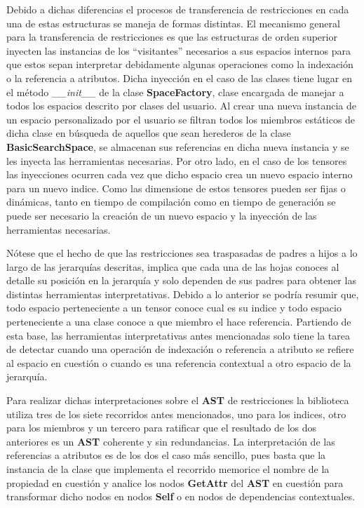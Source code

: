 Debido a dichas diferencias el procesos de transferencia de restricciones en cada una de estas estructuras se maneja de formas
distintas. El mecanismo general para la transferencia de restricciones es que las estructuras de orden superior inyecten las
instancias de los ``visitantes'' necesarios a sus espacios internos para que estos sepan interpretar debidamente algunas operaciones
como la indexación o la referencia a atributos. Dicha inyección en el caso de las clases tiene lugar en el método \newline
{\it \_\_init\_\_} de la clase {\bf SpaceFactory}, clase encargada de manejar a todos los espacios descrito por clases del usuario. Al crear una nueva instancia
de un espacio personalizado por el usuario se filtran todos los miembros estáticos de dicha clase en búsqueda de aquellos que sean
herederos de la clase {\bf BasicSearchSpace}, se almacenan sus referencias en dicha nueva instancia y se les inyecta las herramientas
necesarias. Por otro lado, en el caso de los tensores las inyecciones ocurren cada vez que dicho espacio crea un nuevo espacio
interno para un nuevo indice. Como las dimensione de estos tensores pueden ser fijas o dinámicas, tanto en tiempo de compilación
como en tiempo de generación se puede ser necesario la creación de un nuevo espacio y la inyección de las herramientas necesarias.

Nótese que el hecho de que las restricciones sea traspasadas de padres a hijos a lo largo de las jerarquías descritas, implica que
cada una de las hojas conoces al detalle su posición en la jerarquía y solo dependen de sus padres para obtener las distintas
herramientas interpretativas. Debido a lo anterior se podría resumir que, todo espacio perteneciente a un tensor conoce cual es
su indice y todo espacio perteneciente a una clase conoce a que miembro el hace referencia. Partiendo de esta base, las herramientas
interpretativas antes mencionadas solo tiene la tarea de detectar cuando una operación de indexación o referencia a atributo se refiere
al espacio en cuestión o cuando es una referencia contextual a otro espacio de la jerarquía.

Para realizar dichas interpretaciones sobre el {\bf AST} de restricciones la biblioteca utiliza tres de los siete recorridos antes mencionados,
uno para los indices, otro para los miembros y un tercero para ratificar que el resultado de los dos anteriores es un {\bf AST} coherente y sin
redundancias. La interpretación de las referencias a atributos es de los dos el caso más sencillo, pues basta que la instancia de la
clase que implementa el recorrido memorice el nombre de la propiedad en cuestión y analice los nodos {\bf GetAttr} del {\bf AST} en cuestión
para transformar dicho nodos en nodos {\bf Self} o en nodos de dependencias contextuales.

